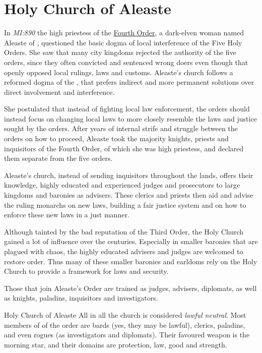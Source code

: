 \section{Holy Church of Aleaste}
\label{sec:Holy Church of Aleaste}

In \emph{MI:890} the high priestess of the
\hyperref[sec:Four Holy Orders]{Fourth Order}, a dark-elven woman named
Aleaste of , questioned the basic dogma of local
interference of the Five Holy Orders. She saw that many city kingdoms rejected
the authority of the five orders, since they often convicted and sentenced
wrong doers even though that openly opposed local rulings, laws and customs.
Aleaste's church follows a reformed dogma of the , that
prefers indirect and more permanent solutions over direct involvement and
interference.

She postulated that instead of fighting local law enforcement, the orders
should instead focus on changing local laws to more closely resemble the laws
and justice sought by the orders. After years of internal strife and struggle
between the orders on how to proceed, Aleaste took the majority knights, priests
and inquisitors of the Fourth Order, of which she was high priestess, and
declared them separate from the five orders.

Aleaste's church, instead of sending inquisitors throughout the lands, offers
their knowledge, highly educated and experienced judges and prosecutors to
large kingdoms and baronies as advisers. These clerics and priests then aid
and advise the ruling monarchs on new laws, building a fair justice system and
on how to enforce these new laws in a just manner.

Although tainted by the bad reputation of the Third Order, the Holy Church
gained a lot of influence over the centuries. Especially in smaller baronies
that are plagued with chaos, the highly educated advisers and judges are
welcomed to restore order. Thus many of these smaller baronies and earldoms
rely on the Holy Church to provide a framework for laws and security.

Those that join Aleaste's Order are trained as judges, advisers, diplomats, as
well as knights, paladins, inquisitors and investigators.

\begin{35e}{Holy Church of Aleaste}
  All in all the church is considered \emph{lawful neutral}. Most members of
  of the order are bards (yes, they may be lawful), clerics, paladins, and even
  rogues (as investigators and diplomats). Their favoured weapon is the morning
  star, and their domains are protection, law, good and strength.
\end{35e}

